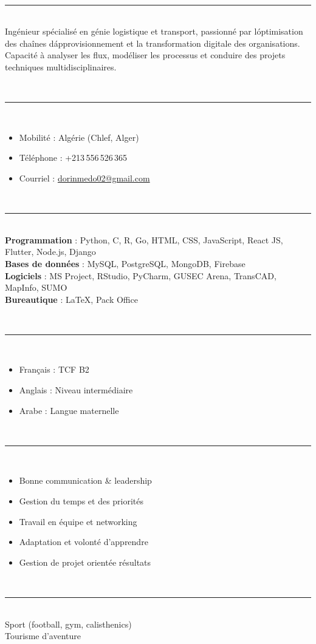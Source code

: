 \documentclass[10pt,a4paper]{article}
\newcommand{\cvsection}[1]{\vspace{0.6em}\noindent{\bfseries\textcolor{primary}{#1}}\\[-0.2em]\textcolor{primary}{\rule{\linewidth}{0.5pt}}\\[0.2em]}
\begin{document}
\begin{paracol}{2}
\sloppy

\cvsection{PROFIL}
Ing\'enieur sp\'ecialis\'e en g\'enie logistique et transport, passionn\'e par l\'optimisation des cha\^ines d\'approvisionnement et la transformation digitale des organisations. Capacit\'e \`a analyser les flux, mod\'eliser les processus et conduire des projets techniques multidisciplinaires.

\cvsection{INFORMATIONS}
\begin{itemize}
    \item Mobilit\'e : Alg\'erie (Chlef, Alger)
    \item T\'el\'ephone : +213\,556\,526\,365
    \item Courriel : \href{mailto:dorinmedo02@gmail.com}{dorinmedo02@gmail.com}
\end{itemize}

\cvsection{COMP\'ETENCES TECHNIQUES}
\textbf{Programmation} : Python, C, R, Go, HTML, CSS, JavaScript, React JS, Flutter, Node.js, Django\\
\textbf{Bases de donn\'ees} : MySQL, PostgreSQL, MongoDB, Firebase\\
\textbf{Logiciels} : MS Project, RStudio, PyCharm, GUSEC Arena, TransCAD, MapInfo, SUMO\\
\textbf{Bureautique} : LaTeX, Pack Office

\cvsection{LANGUES}
\begin{itemize}
    \item Fran\c{c}ais : TCF B2
    \item Anglais : Niveau interm\'ediaire
    \item Arabe : Langue maternelle
\end{itemize}

\cvsection{SOFT SKILLS}
\begin{itemize}
    \item Bonne communication \& leadership
    \item Gestion du temps et des priorit\'es
    \item Travail en \'equipe et networking
    \item Adaptation et volont\'e d'apprendre
    \item Gestion de projet orient\'ee r\'esultats
\end{itemize}

\cvsection{CENTRES D'INT\'ER\^ET}
Sport (football, gym, calisthenics)\\
Tourisme d'aventure


\end{paracol}
\end{document}
